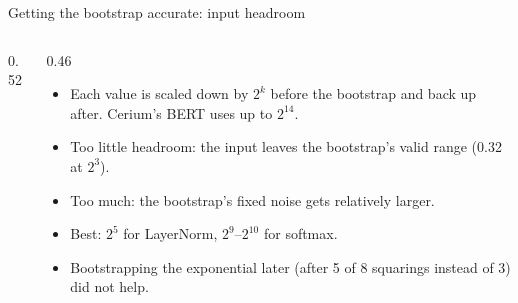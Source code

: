 \documentclass[aspectratio=169]{beamer}
\begin{document}
\begin{frame}{Getting the bootstrap accurate: input headroom}
\small
\begin{columns}[T]
\begin{column}{0.52\textwidth}
\end{column}
\begin{column}{0.46\textwidth}
\begin{itemize}\small
  \item Each value is scaled down by $2^{k}$ before the bootstrap and back up after. Cerium's BERT uses up to $2^{14}$.
  \item Too little headroom: the input leaves the bootstrap's valid range (0.32 at $2^3$).
  \item Too much: the bootstrap's fixed noise gets relatively larger.
  \item Best: $2^5$ for LayerNorm, $2^9$--$2^{10}$ for softmax.
  \item Bootstrapping the exponential later (after 5 of 8 squarings instead of 3) did not help.
\end{itemize}
\end{column}
\end{columns}
\end{frame}
\end{document}
